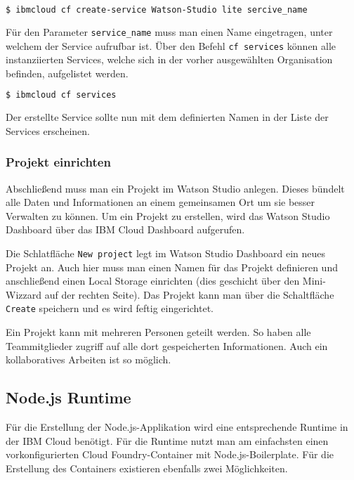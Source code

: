 \begin{lstlisting}[language=bash, caption=Instanziierung des Watson Studio Services, label=ls:vorbereitung_watsonservice]
    $ ibmcloud cf create-service Watson-Studio lite sercive_name
\end{lstlisting}

Für den Parameter \texttt{service\_name} muss man einen Name eingetragen, unter welchem der Service aufrufbar ist. Über
den Befehl \texttt{cf services} können alle instanziierten Services, welche sich in der vorher ausgewählten Organisation
befinden, aufgelistet werden.

\begin{lstlisting}[language=bash, caption=Auflisten aller Services in einer Organisation, label=ls:vorbereitung_alleservices]
    $ ibmcloud cf services
\end{lstlisting}

Der erstellte Service sollte nun mit dem definierten Namen in der Liste der Services erscheinen.

\subsubsection{Projekt einrichten}

Abschließend muss man ein Projekt im Watson Studio anlegen. Dieses bündelt alle Daten und Informationen an einem
gemeinsamen Ort um sie besser Verwalten zu können. Um ein Projekt zu erstellen, wird das Watson Studio Dashboard über
das IBM Cloud Dashboard aufgerufen.

Die Schlatfläche \texttt{New project} legt im Watson Studio Dashboard ein neues Projekt an. Auch hier muss man einen
Namen für das Projekt definieren und anschließend einen Local Storage einrichten (dies geschicht über den Mini-Wizzard
auf der rechten Seite). Das Projekt kann man über die Schaltfläche \texttt{Create} speichern und es wird feftig
eingerichtet.

Ein Projekt kann mit mehreren Personen geteilt werden. So haben alle Teammitglieder zugriff auf alle dort gespeicherten
Informationen. Auch ein kollaboratives Arbeiten ist so möglich.

\subsection{Node.js Runtime}
\label{ssc:nodejs_runtime}
Für die Erstellung der Node.js-Applikation wird eine entsprechende Runtime in der IBM Cloud benötigt. Für die Runtime
nutzt man am einfachsten einen vorkonfigurierten Cloud Foundry-Container mit Node.js-Boilerplate. Für die Erstellung
des Containers existieren ebenfalls zwei Möglichkeiten.

